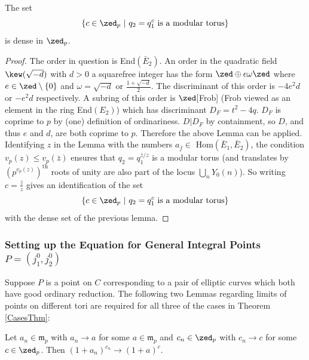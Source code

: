 \documentclass[12pt,letterpaper]{article}
\begin{document}
	
	\begin{cor} \label{powercalculation}
		The set \[\{c\in \zed_p \ | \ q_2 = q_1^c \text{ is a modular torus}\}\] is dense in $\zed_p$.
		
	
	\end{cor}
	
	\begin{proof}
		The order in question is End$(\bar{E}_2)$. An order in the quadratic field $\kew(\sqrt{-d})$ with $d>0$ a squarefree integer has the form $\zed\oplus e\omega \zed$ where $e\in \zed\setminus\{0\}$ and $\omega =  \sqrt{-d}$ or $\frac{1+\sqrt{-d}}{2}$. The discriminant of this order is $-4e^2d$ or $-e^2d$ respectively. A subring of this order is $\zed[$Frob] (Frob viewed as an element in the ring End$(E_2)$) which has discriminant $D_F = t^2-4q$. $D_F$ is coprime to $p$ by (one) definition of ordinariness. $D|D_F$ by containment, so $D$, and thus $e$ and $d$, are both coprime to $p$. Therefore the above Lemma can be applied. Identifying $z$ in the Lemma with the numbers $a_{\bar{f}}\in$ Hom$(\bar{E}_1,\bar{E}_2)$, the condition $v_p(z)\leq v_p(\bar{z})$ ensures that $q_2 = q_1^{\bar{z}/z}$ is a modular torus (and translates by $(p^{v_p(z)})^\text{th}$ roots of unity are also part of the locus $\bigcup_nY_0(n)$). So writing $c =\frac{\bar{z}}{z}$ gives an identification of the set \[\{c\in \zed_p \ | \ q_2 = q_1^c \text{ is a modular torus}\}\] with the dense set of the previous lemma.
	\end{proof}
	
	

	
	
	
	

	\subsubsection{Setting up the Equation for General Integral Points $P=(j_1^0,j_2^0)$}
	
	Suppose $P$ is a point on $C$ corresponding to a pair of elliptic curves which both have good ordinary reduction. The following two Lemmas regarding limits of points on different tori are required for all three of the cases in Theorem \ref{CasesThm}:
	
	
	
	\begin{lemma}\label{uniform}
		Let $a_n \in \mathfrak{m}_p$ with  $a_n \to a$ for some $a\in \mathfrak{m}_p$ and $c_n\in \zed_p$ with $c_n \to c$ for some $c\in \zed_p$. Then $(1+a_n)^{c_n}\to (1+a)^c$.
	\end{lemma}
	
\end{document}
